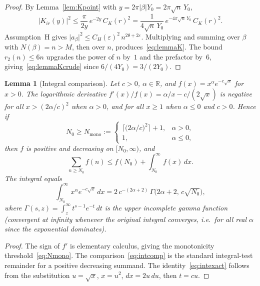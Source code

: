 \documentclass[11pt]{amsart}
\newtheorem{lemma}[theorem]{Lemma}
\theoremstyle{definition}
\newcommand{\RR}{\mathbb{R}}
\newcommand{\abs}[1]{\lvert#1\rvert}
\newcommand{\eps}{\varepsilon}
\newcommand{\tht}{\theta}
\begin{document}
\begin{proof}
By Lemma~\ref{lem:Kpoint} with $y=2\pi\abs{\beta}Y_0=2\pi\sqrt{n}\,Y_0$,
\begin{equation}
\label{eq:Ksq}
  \abs{K_{ir}(y)}^2
  \le
  \frac{\pi}{2y}\,e^{-2y}\,C_K(r)^2
  =
  \frac{1}{4\sqrt{n}\,Y_0}\,
  e^{-4\pi\sqrt{n}\,Y_0}\,
  C_K(r)^2.
\end{equation}
Assumption~H gives $\abs{a_\beta}^2\le C_H(\eps)^2\,n^{2\tht+2\eps}$.
Multiplying and summing over $\beta$ with $N(\beta)=n>M$, then over $n$,
produces~\eqref{eq:lemmaK}.  The bound $r_2(n)\le 6n$ upgrades the
power of $n$ by~$1$ and the prefactor by~$6$, giving~\eqref{eq:lemmaKcrude}
since $6/(4Y_0)=3/(2Y_0)$.
\end{proof}

\begin{lemma}[Integral comparison]
\label{lem:integral}
Let $c>0$, $\alpha\in\RR$, and $f(x)=x^\alpha e^{-c\sqrt{x}}$ for $x>0$.
The logarithmic derivative
$f'(x)/f(x)=\alpha/x - c/(2\sqrt{x})$ is negative for all
$x>(2\alpha/c)^2$ when $\alpha>0$, and for all $x\ge 1$ when
$\alpha\le 0$ and $c>0$.  Hence if
\begin{equation}
\label{eq:Nmono}
  N_0
  \ge
  N_{\mathrm{mono}}
  :=
  \begin{cases}
    \bigl\lceil\bigl(2\alpha/c\bigr)^2\bigr\rceil+1, & \alpha>0,\\
    1, & \alpha\le 0,
  \end{cases}
\end{equation}
then $f$ is positive and decreasing on $[N_0,\infty)$, and
\begin{equation}
\label{eq:intcomp}
  \sum_{n\ge N_0} f(n)
  \le
  f(N_0)
  +
  \int_{N_0}^\infty f(x)\,dx.
\end{equation}
The integral equals
\begin{equation}
\label{eq:intexact}
  \int_{N_0}^\infty x^\alpha e^{-c\sqrt{x}}\,dx
  =
  2\,c^{-(2\alpha+2)}\,
  \Gamma\bigl(2\alpha+2,\,c\sqrt{N_0}\bigr),
\end{equation}
where $\Gamma(s,z)=\int_z^\infty t^{s-1}e^{-t}\,dt$ is the upper incomplete
gamma function (convergent at infinity whenever the original integral
converges, i.e.\ for all real $\alpha$ since the exponential dominates).
\end{lemma}

\begin{proof}
The sign of $f'$ is elementary calculus, giving the monotonicity
threshold~\eqref{eq:Nmono}.  The comparison~\eqref{eq:intcomp} is the
standard integral-test remainder for a positive decreasing summand.  The
identity~\eqref{eq:intexact} follows from the substitution $u=\sqrt{x}$,
$x=u^2$, $dx=2u\,du$, then $t=cu$.
\end{proof}
\end{document}
